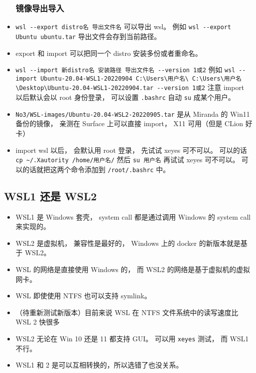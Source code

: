 \begin{itemize}
\subsubsection{镜像导出导入}
\item \verb`wsl --export distro名 导出文件名` 可以导出 wsl。 例如 \verb`wsl --export Ubuntu ubuntu.tar` 导出文件会存到当前路径。
\item export 和 import 可以把同一个 distro 安装多份或者重命名。
\item \verb`wsl --import 新distro名 安装路径 导出文件名 --version 1或2` 例如 \verb`wsl --import Ubuntu-20.04-WSL1-20220904 C:\Users\用户名\ C:\Users\用户名\Desktop\Ubuntu-20.04-WSL1-20220904.tar --version 1或2` 注意 import 以后默认会以 root 身份登录， 可以设置 \verb`.bashrc` 自动 \verb`su` 成某个用户。
\item \verb`No3/WSL-images/Ubuntu-20.04-WSL2-20220905.tar` 是从 Miranda 的 Win11 备份的镜像， 亲测在 Surface 上可以直接 import， X11 可用（但是 CLion 好卡）
\item import wsl 以后， 会默认用 root 登录， 先试试 xeyes 可不可以。 可以的话 \verb`cp ~/.Xautority /home/用户名/` 然后 \verb`su 用户名` 再试试 xeyes 可不可以。 可以的话就把这两个命令添加到 \verb`/root/.bashrc` 中。
\end{itemize}

\subsection{WSL1 还是 WSL2}
\begin{itemize}
\item WSL1 是 Windows 套壳， system call 都是通过调用 Windows 的 system call 来实现的。
\item WSL2 是虚拟机， 兼容性是最好的， Windows 上的 docker 的新版本就是基于 WSL2。
\item WSL 的网络是直接使用 Windows 的， 而 WSL2 的网络是基于虚拟机的虚拟网卡。
\item WSL 即使使用 NTFS 也可以支持 symlink。
\item （待重新测试新版本）目前来说 WSL 在 NTFS 文件系统中的读写速度比 WSL 2 快很多
\item WSL2 无论在 Win 10 还是 11 都支持 GUI。 可以用 \verb|xeyes| 测试， 而 WSL1 不行。
\item WSL1 和 2 是可以互相转换的，所以选错了也没关系。
\end{itemize}

